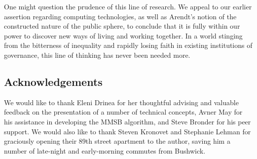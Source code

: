 \bigskip

One might question the prudence of this line of research.
We appeal to our earlier assertion regarding computing technologies, as well as Arendt's notion of the constructed nature of the public sphere, to conclude that it is fully within our power to discover new ways of living and working together.
In a world stinging from the bitterness of inequality and rapidly losing faith in existing institutions of governance, this line of thinking has never been needed more.

\subsection{Acknowledgements}

We would like to thank Eleni Drinea for her thoughtful advising and valuable feedback on the presentation of a number of technical concepts, Avner May for his assistance in developing the MMSB algorithm, and Steve Bronder for his peer support.
We would also like to thank Steven Kronovet and Stephanie Lehman for graciously opening their 89th street apartment to the author, saving him a number of late-night and early-morning commutes from Bushwick. 